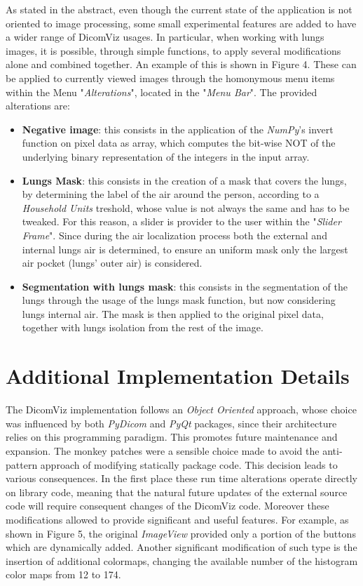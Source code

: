 \documentclass[conference]{IEEEtran}
\begin{document}
As stated in the abstract, even though the current state of the application is not oriented to image processing, some small experimental features are added to have a wider range of DicomViz usages. In particular, when working with lungs images, it is possible, through simple functions, to apply several modifications alone and combined together. An example of this is shown in Figure 4. These can be applied to currently viewed images through the homonymous menu items within the Menu "\textit{Alterations}", located in the "\textit{Menu Bar}". The provided alterations are:
\begin{itemize}
    \item \textbf{Negative image}: this consists in the application of the  \textit{NumPy}'s invert function on pixel data as array, which computes the bit-wise NOT of the underlying binary representation of the integers in the input array.

    \item \textbf{Lungs Mask}: this consists in the creation of a mask that covers the lungs, by determining the label of the air around the person, according to a  \textit{Household Units} treshold, whose value is not always the same and has to be tweaked. For this reason, a slider is provider to the user within the "\textit{Slider Frame}". Since during the air localization process both the external and internal lungs air is determined, to ensure an uniform mask only the largest air pocket (lungs' outer air) is considered.

    \item \textbf{Segmentation with lungs mask}: this consists in the segmentation of the lungs through the usage of the lungs mask function, but now considering lungs internal air. The mask is then applied to the original pixel data, together with lungs isolation from the rest of the image.
\end{itemize}


\section{Additional Implementation Details}

The DicomViz implementation follows an  \textit{Object Oriented} approach, whose choice was influenced by both  \textit{PyDicom} and  \textit{PyQt} packages, since their architecture relies on this programming paradigm. This promotes future maintenance and expansion.
The monkey patches were a sensible choice made to avoid the anti-pattern approach of modifying statically package code. This decision leads to various consequences. In the first place these run time alterations operate directly on library code, meaning that the natural future updates of the external source code will require consequent changes of the DicomViz code. Moreover these modifications allowed to provide significant and useful features. For example, as shown in Figure 5, the original  \textit{ImageView} provided only a portion of the buttons which are dynamically added. Another significant modification of such type is the insertion of additional colormaps, changing the available number of the histogram color maps from 12 to 174.
\end{document}
